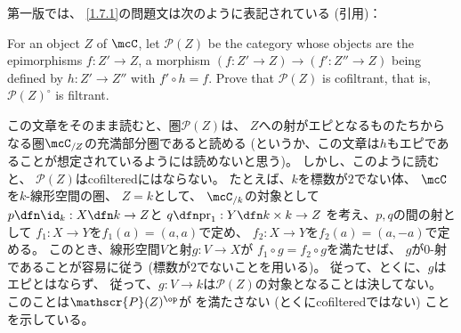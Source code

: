 \documentclass[uplatex,dvipdfmx]{jsarticle}
\begin{document}
\begin{rem*}
  \cite{kashiwara2002sheaves}第一版では、
  \ref{1.7.1}の問題文は次のように表記されている (引用)：

  For an object \(Z\) of \(\mcC\),
  let \(\mathscr{P}(Z)\) be the category
  whose objects are the epimorphisms \(f:Z'\to Z\),
  a morphism \((f:Z'\to Z) \to (f':Z''\to Z)\)
  being defined by \(h:Z'\to Z''\) with \(f'\circ h = f\).
  Prove that \(\mathscr{P}(Z)\) is cofiltrant,
  that is, \(\mathscr{P}(Z)^{\circ}\) is filtrant.

  この文章をそのまま読むと、圏\(\mathscr{P}(Z)\)は、
  \(Z\)への射がエピとなるものたちからなる圏\(\mcC_{/Z}\)の充満部分圏であると読める
  (というか、この文章は\(h\)もエピであることが想定されているようには読めないと思う)。
  しかし、このように読むと、
  \(\mathscr{P}(Z)\)はcofilteredにはならない。
  たとえば、\(k\)を標数が\(2\)でない体、
  \(\mcC\)を\(k\)-線形空間の圏、
  \(Z=k\)として、
  \(\mcC_{/k}\)の対象として
  \(p\dfn \id_k: X\dfn k\to Z\)と
  \(q\dfn \mathrm{pr}_1:Y \dfn k\times k \to Z\)
  を考え、\(p,q\)の間の射として
  \(f_1:X\to Y\)を\(f_1(a) = (a,a)\)で定め、
  \(f_2:X\to Y\)を\(f_2(a) = (a,-a)\)で定める。
  このとき、線形空間\(V\)と射\(g:V\to X\)が
  \(f_1\circ g = f_2\circ g\)を満たせば、
  \(g\)が\(0\)-射であることが容易に従う (標数が\(2\)でないことを用いる)。
  従って、とくに、\(g\)はエピとはならず、
  従って、\(g:V\to k\)は\(\mathscr{P}(Z)\)の対象となることは決してない。
  このことは\(\mathscr{P}(Z)^{\op}\)が
  \cite[Definition 1.11.2 (1.11.2)]{kashiwara2002sheaves}を満たさない
  (とくにcofilteredではない) ことを示している。
\end{rem*}
\end{document}
